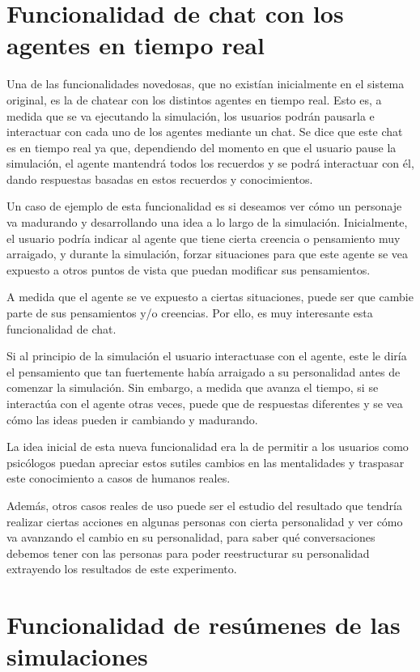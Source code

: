 \section{Funcionalidad de chat con los agentes en tiempo real}

Una de las funcionalidades novedosas, que no existían inicialmente en el sistema original, es la de chatear con los distintos agentes en tiempo real. Esto es, a medida que se va ejecutando la simulación, los usuarios podrán pausarla e interactuar con cada uno de los agentes mediante un chat. Se dice que este chat es en tiempo real ya que, dependiendo del momento en que el usuario pause la simulación, el agente mantendrá todos los recuerdos y se podrá interactuar con él, dando respuestas basadas en estos recuerdos y conocimientos.

Un caso de ejemplo de esta funcionalidad es si deseamos ver cómo un personaje va madurando y desarrollando una idea a lo largo de la simulación. Inicialmente, el usuario podría indicar al agente que tiene cierta creencia o pensamiento muy arraigado, y durante la simulación, forzar situaciones para que este agente se vea expuesto a otros puntos de vista que puedan modificar sus pensamientos.

A medida que el agente se ve expuesto a ciertas situaciones, puede ser que cambie parte de sus pensamientos y/o creencias. Por ello, es muy interesante esta funcionalidad de chat.

Si al principio de la simulación el usuario interactuase con el agente, este le diría el pensamiento que tan fuertemente había arraigado a su personalidad antes de comenzar la simulación. Sin embargo, a medida que avanza el tiempo, si se interactúa con el agente otras veces, puede que de respuestas diferentes y se vea cómo las ideas pueden ir cambiando y madurando.

La idea inicial de esta nueva funcionalidad era la de permitir a los usuarios como psicólogos puedan apreciar estos sutiles cambios en las mentalidades y traspasar este conocimiento a casos de humanos reales.

Además, otros casos reales de uso puede ser el estudio del resultado que tendría realizar ciertas acciones en algunas personas con cierta personalidad y ver cómo va avanzando el cambio en su personalidad, para saber qué conversaciones debemos tener con las personas para poder reestructurar su personalidad extrayendo los resultados de este experimento.

\section{Funcionalidad de resúmenes de las simulaciones}

